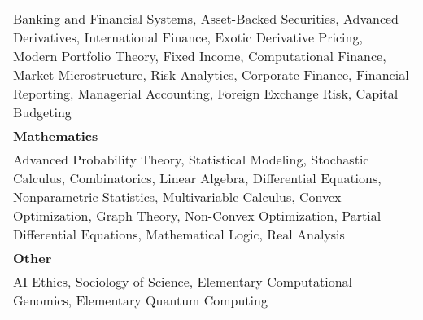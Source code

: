 \documentclass[10pt, letterpaper]{letter}
\begin{document}
\begin{tabularx}{\textwidth}{X}
            Banking and Financial Systems, 
            Asset-Backed Securities, 
            Advanced Derivatives, 
            International Finance, 
            Exotic Derivative Pricing, 
            Modern Portfolio Theory, 
            Fixed Income, 
            Computational Finance, 
            Market Microstructure, 
            Risk Analytics, 
            Corporate Finance, 
            Financial Reporting, 
            Managerial Accounting, 
            Foreign Exchange Risk, 
            Capital Budgeting \\
        
            \textbf{Mathematics} \\
            
            Advanced Probability Theory, 
            Statistical Modeling, 
            Stochastic Calculus, 
            Combinatorics, 
            Linear Algebra, 
            Differential Equations, 
            Nonparametric Statistics, 
            Multivariable Calculus, 
            Convex Optimization, 
            Graph Theory, 
            Non-Convex Optimization, 
            Partial Differential Equations, 
            Mathematical Logic, 
            Real Analysis \\
        
            \textbf{Other} \\
            
            AI Ethics, 
            Sociology of Science, 
            Elementary Computational Genomics, 
            Elementary Quantum Computing \\
        
    \end{tabularx}
\end{document}
